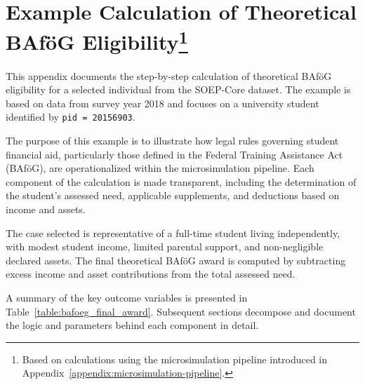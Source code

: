 

\newpage
\section[Example Calculation of Theoretical BAföG Eligibility]{Example Calculation of Theoretical BAföG Eligibility\footnote{Based on calculations using the microsimulation pipeline introduced in Appendix~\ref{appendix:microsimulation-pipeline}.}}
\label{appendix:simulation-example}

This appendix documents the step-by-step calculation of theoretical BAföG eligibility for a selected individual from the SOEP-Core dataset. The example is based on data from survey year 2018 and focuses on a university student identified by \texttt{pid = 20156903}.

The purpose of this example is to illustrate how legal rules governing student financial aid, particularly those defined in the Federal Training Assistance Act (BAföG), are operationalized within the microsimulation pipeline. Each component of the calculation is made transparent, including the determination of the student's assessed need, applicable supplements, and deductions based on income and assets.

The case selected is representative of a full-time student living independently, with modest student income, limited parental support, and non-negligible declared assets. The final theoretical BAföG award is computed by subtracting excess income and asset contributions from the total assessed need.

A summary of the key outcome variables is presented in Table~\ref{table:bafoeg_final_award}. Subsequent sections decompose and document the logic and parameters behind each component in detail. 







